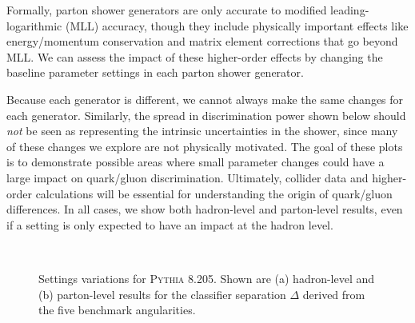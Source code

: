 \documentclass[11pt]{cernrep}
\begin{document}
Formally, parton shower generators are only accurate to modified leading-logarithmic (MLL) accuracy, though they include physically important effects like energy/momentum conservation and matrix element corrections that go beyond MLL.  We can assess the impact of these higher-order effects by changing the baseline parameter settings in each parton shower generator.  

Because each generator is different, we cannot always make the same changes for each generator.  Similarly, the spread in discrimination power shown below should \emph{not} be seen as representing the intrinsic uncertainties in the shower, since many of these changes we explore are not physically motivated.  The goal of these plots is to demonstrate possible areas where small parameter changes could have a large impact on quark/gluon discrimination.  Ultimately, collider data and higher-order calculations will be essential for understanding the origin of quark/gluon differences.  In all cases, we show both hadron-level and parton-level results, even if a setting is only expected to have an impact at the hadron level.  

\begin{figure}
\centering
{}
$\qquad$
\caption{Settings variations for \textsc{Pythia 8.205}.  Shown are (a) hadron-level and (b) parton-level results for the classifier separation $\Delta$ derived from the five benchmark angularities.}
\label{quarkgluon_fig:settings_variation_pythia}
\end{figure}
\end{document}
